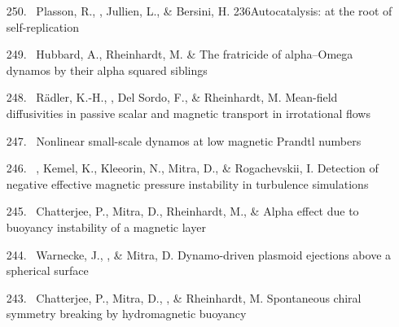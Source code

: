 \begin{itemize}
\item[{250.}~]
Plasson, R., \Brandenburg, Jullien, L., \& Bersini, H.
{236}{Autocatalysis: at the root of self-replication}

\item[{249.}~]
Hubbard, A., Rheinhardt, M. \& \Brandenburg{}
{The fratricide of alpha--Omega dynamos by their alpha squared siblings}

\item[{248.}~]
R\"adler, K.-H., \Brandenburg, Del Sordo, F., \& Rheinhardt, M.
{Mean-field diffusivities in passive scalar and magnetic transport
in irrotational flows}

\item[{247.}~]
\Brandenburg{}
{Nonlinear small-scale dynamos at low magnetic Prandtl numbers}

\item[{246.}~]
\Brandenburg, Kemel, K., Kleeorin, N., Mitra, D., \& Rogachevskii, I.
{Detection of negative effective magnetic pressure instability in turbulence simulations}

\item[{245.}~]
Chatterjee, P., Mitra, D., Rheinhardt, M., \& \Brandenburg{}
{Alpha effect due to buoyancy instability of a magnetic layer}

\item[{244.}~]
Warnecke, J., \Brandenburg, \& Mitra, D.
{Dynamo-driven plasmoid ejections above a spherical surface}

\item[{243.}~]
Chatterjee, P., Mitra, D., \Brandenburg, \& Rheinhardt, M.
{Spontaneous chiral symmetry breaking by hydromagnetic buoyancy}


\end{itemize}
